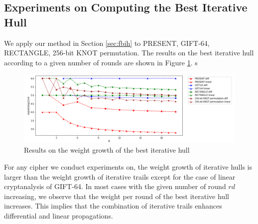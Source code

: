 \subsection{Experiments on Computing the Best Iterative Hull}

We apply our method in Section \ref{sec:fbih} to PRESENT, GIFT-64, RECTANGLE, 256-bit KNOT permutation. The results on the best iterative hull according to a given number of rounds are shown in Figure \ref{fig:plot_ih}. s

\begin{figure}
	\centering
	\includegraphics[width=1\textwidth]{fig/plot_iterative_hulls.PNG}
	\caption{Results on the weight growth of the best iterative hull} \label{fig:plot_ih}
\end{figure}

For any cipher we conduct experiments on, the weight growth of iterative hulls is larger than the weight growth of iterative trails except for the case of linear cryptanalysis of GIFT-64. In most cases with the given number of round $rd$ increasing, we observe that the weight per round of the best iterative hull increases. This implies that the combination of iterative trails enhances differential and linear propagations. 





